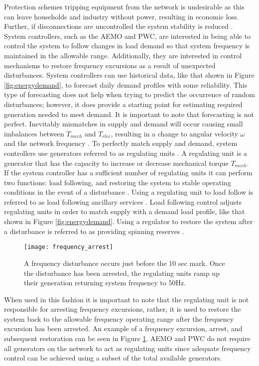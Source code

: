 Protection schemes tripping equipment from the network is undesirable as this can leave households and industry without power, resulting in economic loss. Further, if disconnections are uncontrolled the system stability is reduced \cite{AEMOpowerfreqriskrev}. System controllers, such as the AEMO and PWC, are interested in being able to control the system to follow changes in load demand so that system frequency is maintained in the allowable range. Additionally, they are interested in control mechanisms to restore frequency excursions as a result of unexpected disturbances. System controllers can use historical data, like that shown in Figure \ref{fig:energydemand}, to forecast daily demand profiles with some reliability. This type of forecasting does not help when trying to predict the occurrence of random disturbances; however, it does provide a starting point for estimating required generation needed to meet demand. It is important to note that forecasting is not perfect. Inevitably mismatches in supply and demand will occur causing small imbalances between $T_{mech}$ and $T_{elec}$, resulting in a change to angular velocity $\omega$ and the network frequency \cite{Glover2012}. To perfectly match supply and demand, system controllers use generators referred to as regulating units \cite{Kothari2011}. A regulating unit is a generator that has the capacity to increase or decrease mechanical torque $T_{mech}$. If the system controller has a sufficient number of regulating units it can perform two functions: load following, and restoring the system to stable operating conditions in the event of a disturbance \cite{Grainger1994}. Using a regulating unit to load follow is referred to as load following ancillary services \cite{AEMOancilliaryserv}. Load following control adjusts regulating units in order to match supply with a demand load profile, like that shown in Figure \ref{fig:energydemand}. Using a regulator to restore the system after a disturbance is referred to as providing spinning reserves \cite{AEMOancilliaryserv}.

\begin{figure}[ht]
\centering
\texttt{[image: frequency\_arrest]}
\caption{A frequency disturbance occurs just before the 10 sec mark. Once the disturbance has been arrested, the regulating units ramp up their generation returning system frequency to 50$\si{\hertz}$.}
\label{fig:freqarrest}
\end{figure}

When used in this fashion it is important to note that the regulating unit is not responsible for arresting frequency excursions, rather, it is used to restore the system back to the allowable frequency operating range after the frequency excursion has been arrested. An example of a frequency excursion, arrest, and subsequent restoration can be seen in Figure \ref{fig:freqarrest}. AEMO and PWC do not require all generators on the network to act as regulating units since adequate frequency control can be achieved using a subset of the total available generators.

